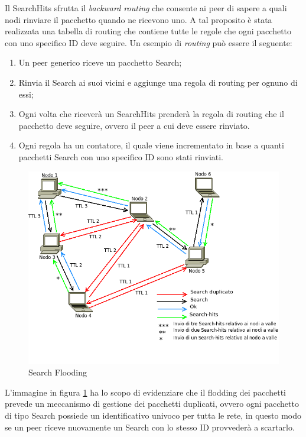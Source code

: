 Il SearchHits sfrutta il \textit{backward routing} che consente ai peer di sapere a quali nodi rinviare il pacchetto quando ne ricevono uno. A tal proposito è stata realizzata una tabella di routing che contiene tutte le regole che ogni pacchetto con uno specifico ID deve seguire.
Un esempio di \textit{routing} può essere il seguente:
\begin{enumerate}
\item Un peer generico riceve un pacchetto Search;
\item Rinvia il Search ai suoi vicini e aggiunge una regola di routing per ognuno di essi;
\item Ogni volta che riceverà un SearchHits prenderà la regola di routing che il pacchetto deve seguire, ovvero il peer a cui deve essere rinviato.
\item Ogni regola ha un contatore, il quale viene incrementato in base a quanti pacchetti Search con uno specifico ID sono stati rinviati.
\end{enumerate}
\begin{figure}[H]
\begin{center}
\includegraphics[scale=0.5]{etc/Search_overlay.png}
\caption{Search Flooding}
\label{searchoverlay}
\end{center}
\end{figure}
L'immagine in figura \ref{searchoverlay} ha lo scopo di evidenziare che il flodding dei pacchetti prevede un meccanismo di gestione dei pacchetti duplicati, ovvero ogni pacchetto di tipo Search possiede un identificativo univoco per tutta le rete, in questo modo se un peer riceve nuovamente un Search con lo stesso ID provvederà a scartarlo.
